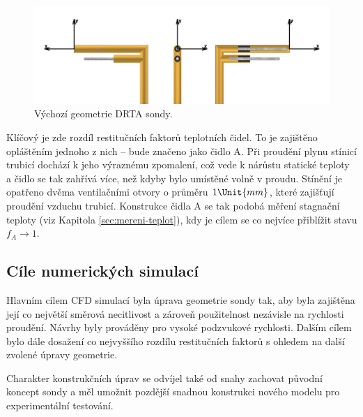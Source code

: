         \begin{figure}[ht!]
            \centering
            \includegraphics[width=\textwidth]{200_DRTA_SONDA/Vychozi_DRTA.png}
            \caption{Výchozí geometrie DRTA sondy.}
            \label{fig:vychozi-DRTA}
        \end{figure}

        Klíčový je zde rozdíl restitučních faktorů teplotních čidel. To je zajištěno opláštěním jednoho z nich – bude značeno jako čidlo A. Při proudění plynu stínicí trubicí dochází k jeho výraznému zpomalení, což vede k nárůstu statické teploty a čidlo se tak zahřívá více, než kdyby bylo umístěné volně v proudu. Stínění je opatřeno dvěma ventilačními otvory o průměru $1 \Unit{mm}$, které zajišťují proudění vzduchu trubicí. Konstrukce čidla A se tak podobá měření stagnační teploty (viz Kapitola \ref{sec:mereni-teplot}), kdy je cílem se co nejvíce přiblížit stavu $f_A \rightarrow 1$.
        \clearpage
        
    \subsection{Cíle numerických simulací}
        Hlavním cílem CFD simulací byla úprava geometrie sondy tak, aby byla zajištěna její co největší směrová necitlivost a zároveň použitelnost nezávisle na rychlosti proudění. Návrhy byly prováděny pro vysoké podzvukové rychlosti. Dalším cílem bylo dále dosažení co nejvyššího rozdílu restitučních faktorů s ohledem na další zvolené úpravy geometrie.

        Charakter konstrukčních úprav se odvíjel také od snahy zachovat původní koncept sondy a měl umožnit pozdější snadnou konstrukci nového modelu pro experimentální testování.